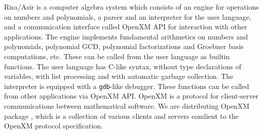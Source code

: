\documentclass[runningheads]{cl2emult}
\begin{document}
Risa/Asir is a computer algebra system which consists of an engine for
operations on numbers and polynomials, a parser and an interpreter for
the user language, and a communication interface called OpenXM API for
interaction with other applications.
The engine implements fundamental arithmetics on numbers and polynomials,
polynomial GCD, polynomial factorizations and Groebner basis computations,
etc. These can be called from the user language as builtin functions.
The user language has C-like syntax, without type declarations
of variables, with list processing and with automatic garbage collection.
The interpreter is equipped with a {\tt gdb}-like debugger.
These functions can be called from other applications via OpenXM API.
OpenXM \cite{noro:RFC100} is a protocol for client-server
communications between mathematical software.  We are distributing
OpenXM package \cite{noro:OPENXM}, which is a collection of various
clients and servers comlient to the OpenXM protocol specification.
\end{document}
